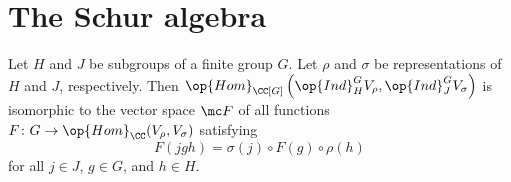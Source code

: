 \documentclass[../main.tex]{subfiles}
\begin{document}
\section{The Schur algebra}
\begin{proposition} \label{prop:homs-of-ind}
	Let $H$ and $J$ be subgroups of a finite group $G$. Let $\rho$ and $\sigma$ be representations of $H$ and $J$, respectively. Then $\op{Hom}_{\CC[G]}\left(\op{Ind}^G_HV_\rho,\op{Ind}^G_JV_\sigma\right)$ is isomorphic to the vector space $\mc F$ of all functions $F\colon G\to\op{Hom}_\CC(V_\rho,V_\sigma)$ satisfying
	\begin{equation}
		F(jgh)=\sigma(j)\circ F(g)\circ\rho(h) \label{eq:desired-schur-vec-space}
	\end{equation}
	for all $j\in J$, $g\in G$, and $h\in H$.
\end{proposition}
\end{document}
